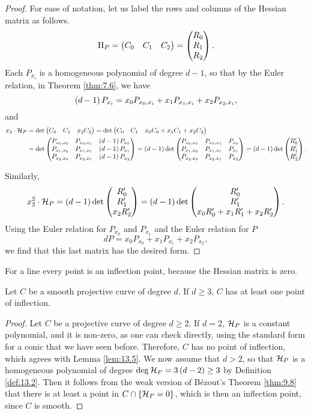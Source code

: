 \begin{proof}
For ease of notation, let us label the rows and columns of the Hessian matrix as follows.
$$ \mathrm{H}_P = \begin{pmatrix} C_0 & C_1 & C_2 \end{pmatrix} = \begin{pmatrix} R_0 \\ R_1 \\ R_2 \end{pmatrix}.
$$
Each $ P_{x_i} $ is a homogeneous polynomial of degree $ d - 1 $, so that by the Euler relation, in Theorem \ref{thm:7.6}, we have
$$ \br{d - 1}P_{x_i} = x_0P_{x_0, x_i} + x_1P_{x_1, x_i} + x_2P_{x_2, x_i}, $$
and
\begin{align*}
x_2 \cdot \HHH_P
& = \det \onebythree{C_0}{C_1}{x_2C_2}
= \det \onebythree{C_0}{C_1}{x_0C_0 + x_1C_1 + x_2C_2} \\
& = \det \threebythree{P_{x_0, x_0}}{P_{x_0, x_1}}{\br{d - 1}P_{x_0}}{P_{x_1, x_0}}{P_{x_1, x_1}}{\br{d - 1}P_{x_1}}{P_{x_2, x_0}}{P_{x_2, x_1}}{\br{d - 1}P_{x_2}}
= \br{d - 1}\det \threebythree{P_{x_0, x_0}}{P_{x_0, x_1}}{P_{x_0}}{P_{x_1, x_0}}{P_{x_1, x_1}}{P_{x_1}}{P_{x_2, x_0}}{P_{x_2, x_1}}{P_{x_2}}
= \br{d - 1}\det \threebyone{R_0'}{R_1'}{R_2'}.
\end{align*}

\pagebreak

Similarly,
$$ x_2^2 \cdot \HHH_P = \br{d - 1}\det \threebyone{R_0'}{R_1'}{x_2R_2'} = \br{d - 1}\det \threebyone{R_0'}{R_1'}{x_0R_0' + x_1R_1' + x_2R_2'}. $$
Using the Euler relation for $ P_{x_0} $ and $ P_{x_1} $ and the Euler relation for $ P $
$$ dP = x_0P_{x_0} + x_1P_{x_1} + x_2P_{x_2}, $$
we find that this last matrix has the desired form.
\end{proof}

\begin{note*}
For a line every point is an inflection point, because the Hessian matrix is zero.
\end{note*}

\begin{lemma}
\label{lem:13.5}
Let $ C $ be a smooth projective curve of degree $ d $. If $ d \ge 3 $, $ C $ has at least one point of inflection.
\end{lemma}

\begin{proof}
Let $ C $ be a projective curve of degree $ d \ge 2 $. If $ d = 2 $, $ \mathcal{H}_P $ is a constant polynomial, and it is non-zero, as one can check directly, using the standard form for a conic that we have seen before. Therefore, $ C $ has no point of inflection, which agrees with Lemma \ref{lem:13.5}. We now assume that $ d > 2 $, so that $ \mathcal{H}_P $ is a homogeneous polynomial of degree $ \deg \HHH_P = 3\br{d - 2} \ge 3 $ by Definition \ref{def:13.2}. Then it follows from the weak version of B\'ezout's Theorem \ref{thm:9.8} that there is at least a point in $ C \cap \cbr{\HHH_P = 0} $, which is then an inflection point, since $ C $ is smooth.
\end{proof}


